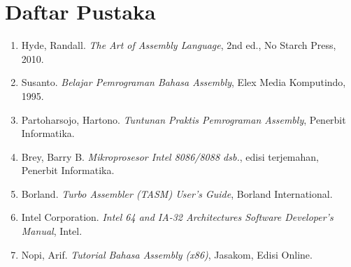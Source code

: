 \documentclass[a4paper,12pt]{book}
\begin{document}
\chapter*{Daftar Pustaka}

\begin{enumerate}
\item Hyde, Randall. \textit{The Art of Assembly Language}, 2nd ed., No Starch Press, 2010.
\item Susanto. \textit{Belajar Pemrograman Bahasa Assembly}, Elex Media Komputindo, 1995.
\item Partoharsojo, Hartono. \textit{Tuntunan Praktis Pemrograman Assembly}, Penerbit Informatika.
\item Brey, Barry B. \textit{Mikroprosesor Intel 8086/8088 dsb.}, edisi terjemahan, Penerbit Informatika.
\item Borland. \textit{Turbo Assembler (TASM) User's Guide}, Borland International.
\item Intel Corporation. \textit{Intel 64 and IA-32 Architectures Software Developer's Manual}, Intel.
\item Nopi, Arif. \textit{Tutorial Bahasa Assembly (x86)}, Jasakom, Edisi Online.
\end{enumerate}
\end{document}
